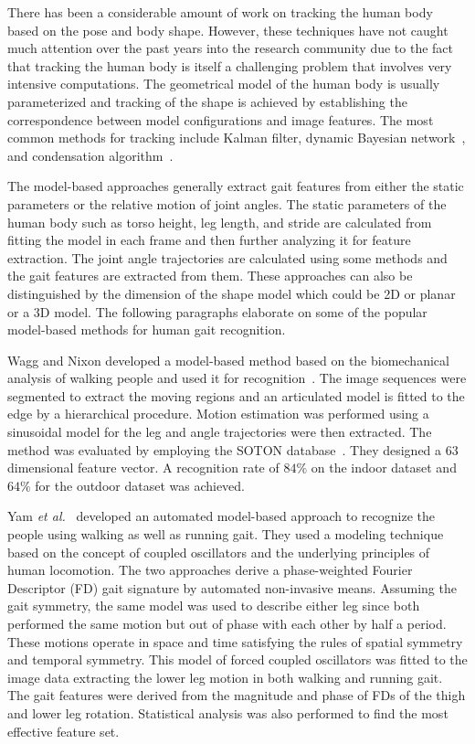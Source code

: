 There has been a considerable amount of work on tracking the human body based on the pose and body shape. However, these techniques have not caught much attention over the past years into the research community due to the fact that tracking the human body is itself a challenging problem that involves very intensive computations. The geometrical model of the human body is usually parameterized and tracking of the shape is achieved by establishing the correspondence between model configurations and image features. The most common methods for tracking include Kalman filter, dynamic Bayesian network~\cite{Pavlovic_99}, and condensation algorithm~\cite{Isard_98}. 

The model-based approaches generally extract gait features from either the static parameters or the relative motion of joint angles. The static parameters of the human body such as torso height, leg length, and stride are calculated from fitting the model in each frame and then further analyzing it for feature extraction. The joint angle trajectories are calculated using some methods and the gait features are extracted from them. These approaches can also be distinguished by the dimension of the shape model which could be 2D or planar or a 3D model. The following paragraphs elaborate on some of the popular model-based methods for human gait recognition.


Wagg and Nixon developed a model-based method based on the biomechanical analysis of walking people and used it for recognition~\cite{Wagg_04}. The image sequences were segmented to extract the moving regions and an articulated model is fitted to the edge by a hierarchical procedure. Motion estimation was performed using a sinusoidal model for the leg and angle trajectories were then extracted. The method was evaluated by employing the SOTON database~\cite{Shutler_04}. They designed a $63$ dimensional feature vector. A recognition rate of $84\%$ on the indoor dataset and $64\%$ for the outdoor dataset was achieved.


Yam \textit{et al.}~\cite{Yam_04} developed an automated model-based approach to recognize the people using walking as well as running gait. They used a modeling technique based on the concept of coupled oscillators and the underlying principles of human locomotion. The two approaches derive a phase-weighted Fourier Descriptor (FD) gait signature by automated non-invasive means. Assuming the gait symmetry, the same model was used to describe either leg since both performed the same motion but out of phase with each other by half a period. These motions operate in space and time satisfying the rules of spatial symmetry and temporal symmetry. This model of forced coupled oscillators was fitted to the image data extracting the lower leg motion in both walking and running gait. The gait features were derived from the magnitude and phase of FDs of the thigh and lower leg rotation. Statistical analysis was also performed to find the most effective feature set. 


